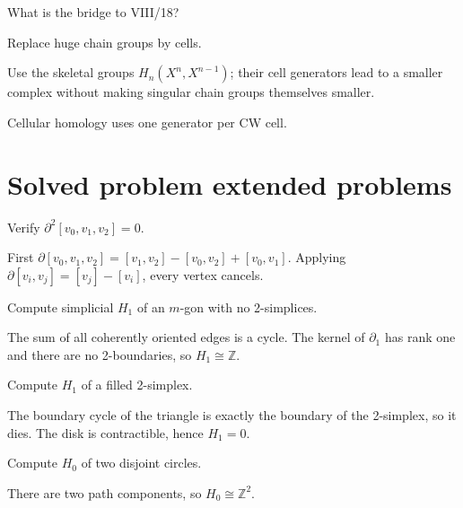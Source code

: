 \begin{exercise}\label{exr:viii17-24}
What is the bridge to VIII/18?
\end{exercise}
\begin{hint}
Replace huge chain groups by cells.

Use the skeletal groups \(H_n(X^n,X^{n-1})\); their cell generators lead to a smaller complex without making singular chain groups themselves smaller.
\end{hint}
\begin{solution}
Cellular homology uses one generator per CW cell.
\end{solution}


\section{Solved problem extended problems}

\begin{problem}\label{prob:viii17-01}
Verify \(\partial^2[v_0,v_1,v_2]=0\).
\end{problem}
\begin{solution}
First \(\partial[v_0,v_1,v_2]=[v_1,v_2]-[v_0,v_2]+[v_0,v_1]\). Applying \(\partial[v_i,v_j]=[v_j]-[v_i]\), every vertex cancels.
\end{solution}

\begin{problem}\label{prob:viii17-02}
Compute simplicial \(H_1\) of an \(m\)-gon with no 2-simplices.
\end{problem}
\begin{solution}
The sum of all coherently oriented edges is a cycle. The kernel of \(\partial_1\) has rank one and there are no 2-boundaries, so \(H_1\cong\mathbb Z\).
\end{solution}

\begin{problem}\label{prob:viii17-03}
Compute \(H_1\) of a filled 2-simplex.
\end{problem}
\begin{solution}
The boundary cycle of the triangle is exactly the boundary of the 2-simplex, so it dies. The disk is contractible, hence \(H_1=0\).
\end{solution}

\begin{problem}\label{prob:viii17-04}
Compute \(H_0\) of two disjoint circles.
\end{problem}
\begin{solution}
There are two path components, so \(H_0\cong\mathbb Z^2\).
\end{solution}

